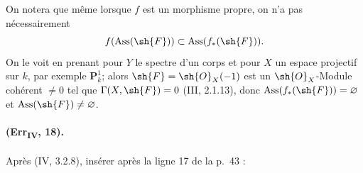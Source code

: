 \begin{remark}[3.1.10.5]
\label{IV.3.1.10.5}
On notera que même lorsque $f$ est un morphisme propre, on n'a pas
nécessairement
\[
 f(\operatorname{Ass}(\sh{F}))\subset
 \operatorname{Ass}(f_*(\sh{F})).
\]
On le voit en prenant pour $Y$ le spectre d'un corps et pour $X$ un
espace projectif sur $k$, par exemple $\mathbf P^1_k$; alors
$\sh{F}=\sh{O}_X(-1)$ est un $\sh{O}_X$-Module cohérent $\neq0$ tel
que $\Gamma(X,\sh{F})=0$ (III, 2.1.13), donc
$\operatorname{Ass}(f_*(\sh{F}))=\varnothing$ et
$\operatorname{Ass}(\sh{F})\neq\varnothing$.
\end{remark}

\paragraph{(Err\textsubscript{IV}, 18).}
Après (IV, 3.2.8), insérer après la ligne 17 de la p.~43 :

